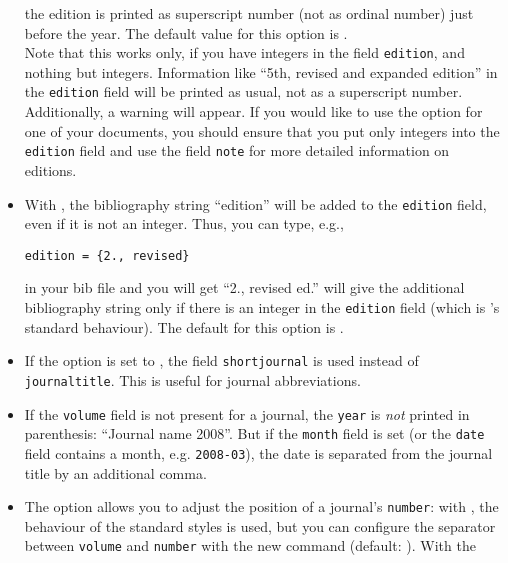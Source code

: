 \documentclass[english]{scrartcl}
\begin{document}
\begin{itemize}
	      the edition is printed as superscript number (not as ordinal number) 
	      just before the year. The default value for this option is 
	      .\\
        \achtung Note that this works only, if you have integers in the field
        \texttt{edition}, and nothing but integers. Information like 
        \enquote{5th, revised and expanded edition} in the \texttt{edition} 
        field will be printed as usual, not as a superscript number.
        Additionally, a warning will appear. If you would like to use the 
        option  for one of your documents, you should ensure 
        that you put only integers into the \texttt{edition} field and use the 
        field \texttt{note} for more detailed information on editions.
	\item With , the 
        bibliography string \enquote{edition} will be added to the 
        \texttt{edition} field, even if it is not an integer. Thus, 
        you can type, e.g., 
	      \begin{lstlisting}
edition = {2., revised}
	      \end{lstlisting}
        in your bib file and you will get \enquote{2., revised ed.}
         will give the additional bibliography
        string only if there is an integer in the \texttt{edition} field
        (which is \bl's standard behaviour).
        The default for this option is . 
	\item If the option  is set to , the
	      field \texttt{shortjournal} is used instead of \texttt{journaltitle}.
	      This is useful for journal abbreviations.
  \item If the \texttt{volume} field is not present for a journal, the 
        \texttt{year} is \emph{not} printed in parenthesis: \enquote{Journal 
        name 2008}. But if the \texttt{month} field is set (or the \texttt{date} field 
				contains a month, e.g. \texttt{2008-03}), the date is
        separated from the journal title by an additional comma.
	\item The option  allows you to adjust the position of
	      a journal's \texttt{number}: with , the behaviour of the
	      standard styles is used, but you can configure the separator between
	      \texttt{volume} and \texttt{number} with the new command
	       (default: ). With  the

\end{itemize}
\end{document}
